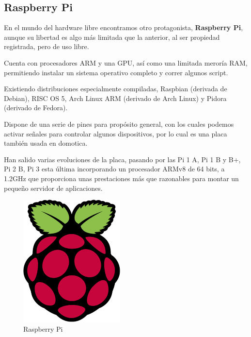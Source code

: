 \newpage

\subsection{Raspberry Pi}

En el mundo del hardware libre encontramos otro protagonista,
\textbf{Raspberry Pi}, aunque su libertad es algo más limitada que la anterior, al ser propiedad registrada, pero de uso libre.

\bigskip
Cuenta con procesadores ARM y una GPU, así como una limitada meroría RAM, permitiendo instalar un sistema operativo completo y correr algunos script. 

\bigskip
Existiendo distribuciones especialmente compiladas, Raspbian (derivada de Debian), RISC OS 5, Arch Linux ARM (derivado de Arch Linux) y Pidora (derivado de Fedora).

\bigskip
Dispone de una serie de pines para propósito general, con los cuales podemos activar señales para controlar algunos dispositivos, por lo cual es una placa también usada en domotica.

\bigskip
Han salido varias evoluciones de la placa, pasando por las Pi 1 A, Pi 1 B y B+, Pi 2 B, Pi 3 esta última incorporando un procesador ARMv8 de 64 bits, a 1.2GHz que proporciona unas prestaciones más que razonables para montar un pequeño servidor de aplicaciones. 


\begin{figure}[h]
\centering
\includegraphics[width=0.2\linewidth]{../images/raspberry}
\caption[Raspberry Pi]{Raspberry Pi}
\label{fig:raspberry}
\end{figure}

